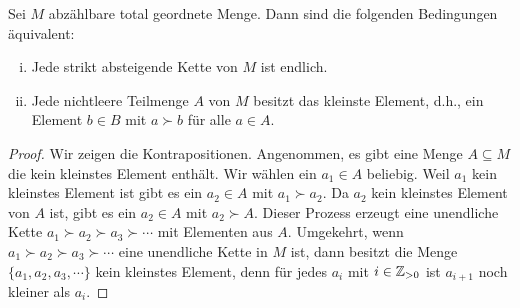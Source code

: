 \documentclass[11pt]{article}
\numberwithin{equation}{section}
\begin{document}
\begin{lemma} \label{lem:ketten:kleinstes:elem}
	Sei $M$ abzählbare total geordnete Menge. Dann sind die folgenden Bedingungen äquivalent: 
	\begin{enumerate}[(i)]
		\item Jede strikt absteigende Kette von $M$ ist endlich. 
		\item Jede nichtleere Teilmenge $A$ von $M$ besitzt das kleinste Element, d.h., ein Element $b \in B$ mit $a \succ b$ für alle $a \in A$. 
	\end{enumerate} 
\end{lemma} 
\begin{proof} 
		Wir zeigen die Kontrapositionen. Angenommen, es gibt eine Menge $A \subseteq M$ die kein kleinstes Element enthält. Wir wählen ein $a_1 \in A$ beliebig. Weil $a_1$ kein kleinstes Element ist gibt es ein $a_2 \in A$ mit $a_1 \succ a_2$. Da $a_2$ kein kleinstes Element von $A$ ist, gibt es ein $a_2 \in A$ mit $a_2 \succ A$. Dieser Prozess erzeugt eine unendliche Kette $a_1 \succ a_2 \succ a_3 \succ \cdots $ mit Elementen aus $A$. Umgekehrt, wenn $a_1 \succ a_2 \succ a_3 \succ \cdots $ eine unendliche Kette in $M$ ist, dann besitzt die Menge $\{a_1,a_2, a_3, \cdots \}$ kein kleinstes Element, denn für jedes $a_i$ mit $i \in \mathbb{Z}_{>0}$ ist $a_{i+1}$ noch kleiner als $a_i$. 
\end{proof} 


\end{document}
